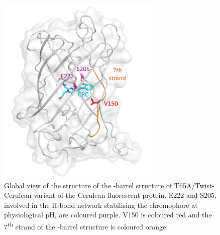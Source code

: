\begin{figure}
    \centering
    \includegraphics[width=0.7\textwidth]{images/T-Cer/Overall.pdf}
    \caption{Global view of the structure of the \textbeta-barrel structure of T65A/Twist-Cerulean variant of the Cerulean fluorescent protein. E222 and S205, involved in the H-bond network stabilising the chromophore at physiological pH, are coloured purple. V150 is coloured red and the 7\textsuperscript{th} strand of the \textbeta-barrel structure is coloured orange. }
    \label{fig:overall}
\end{figure}


